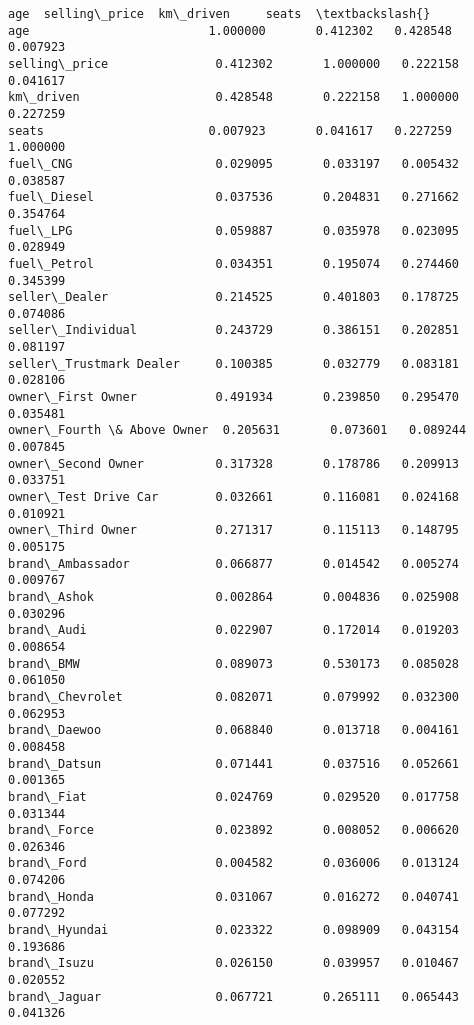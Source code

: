 \documentclass[11pt]{article}
\makeatletter
\newcommand{\boxspacing}{\kern\kvtcb@left@rule\kern\kvtcb@boxsep}
\newcommand{\prompt}[4]{
        {\ttfamily\llap{{\color{#2}[#3]:\hspace{3pt}#4}}\vspace{-\baselineskip}}
    }
\makeatother
\begin{document}
            \begin{tcolorbox}[breakable, size=fbox, boxrule=.5pt, pad at break*=1mm, opacityfill=0]
\prompt{Out}{outcolor}{1389}{\boxspacing}
\begin{Verbatim}[commandchars=\\\{\}]
                                 age  selling\_price  km\_driven     seats  \textbackslash{}
age                         1.000000       0.412302   0.428548  0.007923
selling\_price               0.412302       1.000000   0.222158  0.041617
km\_driven                   0.428548       0.222158   1.000000  0.227259
seats                       0.007923       0.041617   0.227259  1.000000
fuel\_CNG                    0.029095       0.033197   0.005432  0.038587
fuel\_Diesel                 0.037536       0.204831   0.271662  0.354764
fuel\_LPG                    0.059887       0.035978   0.023095  0.028949
fuel\_Petrol                 0.034351       0.195074   0.274460  0.345399
seller\_Dealer               0.214525       0.401803   0.178725  0.074086
seller\_Individual           0.243729       0.386151   0.202851  0.081197
seller\_Trustmark Dealer     0.100385       0.032779   0.083181  0.028106
owner\_First Owner           0.491934       0.239850   0.295470  0.035481
owner\_Fourth \& Above Owner  0.205631       0.073601   0.089244  0.007845
owner\_Second Owner          0.317328       0.178786   0.209913  0.033751
owner\_Test Drive Car        0.032661       0.116081   0.024168  0.010921
owner\_Third Owner           0.271317       0.115113   0.148795  0.005175
brand\_Ambassador            0.066877       0.014542   0.005274  0.009767
brand\_Ashok                 0.002864       0.004836   0.025908  0.030296
brand\_Audi                  0.022907       0.172014   0.019203  0.008654
brand\_BMW                   0.089073       0.530173   0.085028  0.061050
brand\_Chevrolet             0.082071       0.079992   0.032300  0.062953
brand\_Daewoo                0.068840       0.013718   0.004161  0.008458
brand\_Datsun                0.071441       0.037516   0.052661  0.001365
brand\_Fiat                  0.024769       0.029520   0.017758  0.031344
brand\_Force                 0.023892       0.008052   0.006620  0.026346
brand\_Ford                  0.004582       0.036006   0.013124  0.074206
brand\_Honda                 0.031067       0.016272   0.040741  0.077292
brand\_Hyundai               0.023322       0.098909   0.043154  0.193686
brand\_Isuzu                 0.026150       0.039957   0.010467  0.020552
brand\_Jaguar                0.067721       0.265111   0.065443  0.041326

\end{Verbatim}
\end{tcolorbox}
\end{document}
